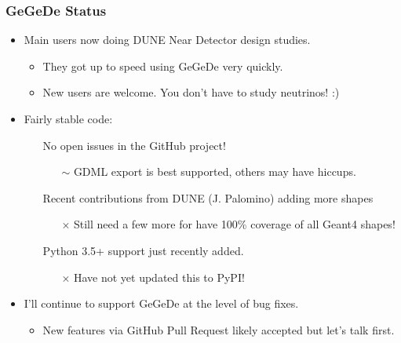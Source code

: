 \documentclass[10pt,xcolor=dvipsnames]{beamer}
\begin{document}
\begin{frame}
  \frametitle{GeGeDe Status}
  \begin{itemize}
  \item Main users now doing DUNE Near Detector design studies.
    \begin{itemize}\footnotesize
    \item They got up to speed using GeGeDe very quickly.
    \item New users are welcome.  You don't have to study neutrinos! :)
    \end{itemize}
  \item Fairly stable code:
    \begin{itemize}\footnotesize
    \item[\checkmark] No open issues in the GitHub project!
      \begin{itemize}\scriptsize
      \item[$\sim$] GDML export is best supported, others may have hiccups.
      \end{itemize}
    \item[\checkmark] Recent contributions from DUNE (J. Palomino) adding more shapes
      \begin{itemize}\scriptsize
      \item[$\times$] Still need a few more for have 100\% coverage of all Geant4 shapes!
      \end{itemize}
    \item[\checkmark] Python 3.5+ support just recently added.
      \begin{itemize}\scriptsize
      \item[$\times$] Have not yet updated this to PyPI!
      \end{itemize}
    \end{itemize}
  \item I'll continue to support GeGeDe at the level of bug fixes.
    \begin{itemize}\footnotesize
    \item New features via GitHub Pull Request likely accepted but let's talk first.
    \end{itemize}
  \end{itemize}

\end{frame}
\end{document}
